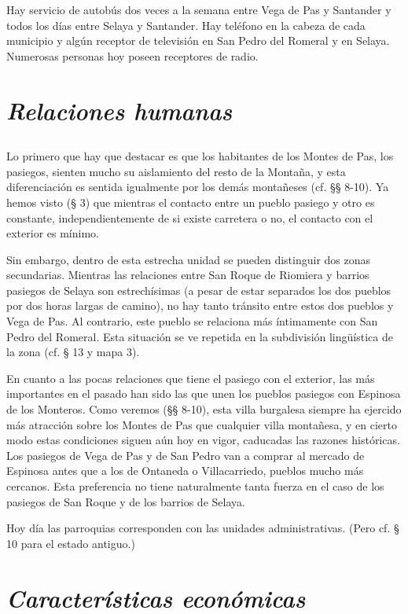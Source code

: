 \documentclass[11pt,spanish,b5paper]{book}
\begin{document}
Hay servicio de autobús dos veces a la semana entre Vega de Pas y Santander y todos los días entre Selaya y Santander. Hay teléfono en la cabeza de cada municipio y algún receptor de televisión en San Pedro del Romeral y en Selaya. Numerosas personas hoy poseen receptores de radio.

\section{\emph{Relaciones humanas}}
\subsection{} Lo primero que hay que destacar es que los habitantes de los Montes de Pas, los pasiegos, sienten mucho su aislamiento del resto de la Montaña, y esta diferenciación es sentida igualmente por los demás montañeses (cf. §§ 8-10). Ya hemos visto (§ 3) que mientras el contacto entre un pueblo pasiego y otro es constante, independientemente de si existe carretera o no, el contacto con el exterior es mínimo.

Sin embargo, dentro de esta estrecha unidad se pueden distinguir dos zonas secundarias. Mientras las relaciones entre San Roque de Riomiera y barrios pasiegos de Selaya son estrechísimas (a pesar de estar separados los dos pueblos por dos horas largas de camino), no hay tanto tránsito entre estos dos pueblos y Vega de Pas. Al contrario, este pueblo se relaciona más íntimamente con San Pedro del Romeral. Esta situación se ve repetida en la subdivisión lingüística de la zona (cf. § 13 y mapa 3).

En cuanto a las pocas relaciones que tiene el pasiego con el exterior, las más importantes en el pasado han sido las que unen los pueblos pasiegos con Espinosa de los Monteros. Como veremos (§§ 8-10), esta villa burgalesa siempre ha ejercido más atracción sobre los Montes de Pas que cualquier villa montañesa, y en cierto modo estas condiciones siguen aún hoy en vigor, caducadas las razones históricas. Los pasiegos de Vega de Pas y de San Pedro van a comprar al mercado de Espinosa antes que a los de Ontaneda o Villacarriedo, pueblos mucho más cercanos. Esta preferencia no tiene naturalmente tanta fuerza en el caso de los pasiegos de San Roque y de los barrios de Selaya.

Hoy día las parroquias corresponden con las unidades administrativas. (Pero cf. § 10 para el estado antiguo.)

\section{\emph{Características económicas}}
\end{document}
